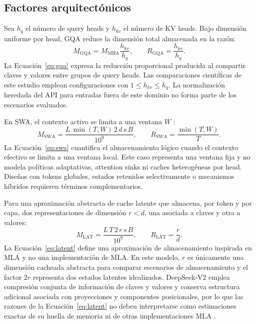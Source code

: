 \documentclass[a4paper,twocolumn]{article}
\begin{document}
\subsection{Factores arquitectónicos}
Sea $h_q$ el número de query heads y $h_{kv}$ el número de KV heads. Bajo dimensión uniforme por head, GQA reduce la dimensión total almacenada en la razón:
\begin{equation}\label{eq:gqa}
M_{\mathrm{GQA}}=M_{\mathrm{MHA}}\frac{h_{kv}}{h_q},\qquad
R_{\mathrm{GQA}}=\frac{h_{kv}}{h_q}.
\end{equation}
La Ecuación~\eqref{eq:gqa} expresa la reducción proporcional producida al compartir claves y valores entre grupos de query heads. Las comparaciones científicas de este estudio emplean configuraciones con $1\leq h_{kv}\leq h_q$. La normalización heredada del API para entradas fuera de este dominio no forma parte de los escenarios evaluados.

En SWA, el contexto activo se limita a una ventana $W$ \cite{jiang2023mistral}:
\begin{equation}\label{eq:swa}
M_{\mathrm{SWA}}=\frac{L\,\min(T,W)\,2\,d\,s\,B}{10^{9}},\qquad
R_{\mathrm{SWA}}=\frac{\min(T,W)}{T}.
\end{equation}
La Ecuación~\eqref{eq:swa} cuantifica el almacenamiento lógico cuando el contexto efectivo se limita a una ventana local. Este caso representa una ventana fija y no modela políticas adaptativas, attention sinks ni caches heterogéneas por head. Diseños con tokens globales, estados retenidos selectivamente o mecanismos híbridos requieren términos complementarios.

Para una aproximación abstracta de cache latente que almacena, por token y por capa, dos representaciones de dimensión $r<d$, una asociada a claves y otra a valores:
\begin{equation}\label{eq:latent}
M_{\mathrm{LAT}}=\frac{L\,T\,2\,r\,s\,B}{10^{9}},\qquad
R_{\mathrm{LAT}}=\frac{r}{d}.
\end{equation}
La Ecuación~\eqref{eq:latent} define una aproximación de almacenamiento inspirada en MLA y no una implementación de MLA. En este modelo, $r$ es únicamente una dimensión cacheada abstracta para comparar escenarios de almacenamiento y el factor $2r$ representa dos estados latentes idealizados. DeepSeek-V2 emplea compresión conjunta de información de claves y valores y conserva estructura adicional asociada con proyecciones y componentes posicionales, por lo que las razones de la Ecuación~\eqref{eq:latent} no deben interpretarse como estimaciones exactas de su huella de memoria ni de otras implementaciones MLA \cite{deepseek2024v2}.
\end{document}
